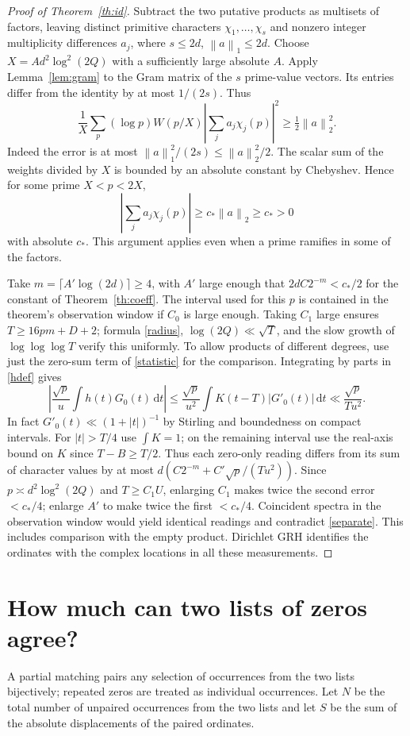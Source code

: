 \documentclass[11pt]{article}
\newcommand{\dd}{\,\mathrm d}
\newcommand{\abs}[1]{\left|#1\right|}
\newcommand{\norm}[1]{\left\lVert#1\right\rVert}
\begin{document}
\begin{proof}[Proof of Theorem~\ref{th:id}]
Subtract the two putative products as multisets of factors, leaving distinct primitive characters $\chi_1,\ldots,\chi_s$ and nonzero integer multiplicity differences $a_j$, where $s\le 2d$, $\norm a_1\le2d$. Choose $X=A d^2\log^2(2Q)$ with a sufficiently large absolute $A$. Apply Lemma~\ref{lem:gram} to the Gram matrix of the $s$ prime-value vectors. Its entries differ from the identity by at most $1/(2s)$. Thus
\[
 \frac1X\sum_p (\log p)W(p/X)\abs{\sum_j a_j\chi_j(p)}^2
     \ge \tfrac12\norm a_2^2.
\]
Indeed the error is at most $\norm a_1^2/(2s)\le\norm a_2^2/2$. The scalar sum of the weights divided by $X$ is bounded by an absolute constant by Chebyshev. Hence for some prime $X<p<2X$,
\begin{equation}\label{separate}
            \abs{\sum_j a_j\chi_j(p)}\ge c_*\norm a_2\ge c_*>0
\end{equation}
with absolute $c_*$. This argument applies even when a prime ramifies in some of the factors.

Take $m=\lceil A'\log(2d)\rceil\ge4$, with $A'$ large enough that
$2dC2^{-m}<c_*/2$ for the constant of Theorem~\ref{th:coeff}. The interval used for this $p$ is contained in the theorem's observation window if $C_0$ is large enough. Taking $C_1$ large ensures $T\ge 16pm+D+2$; formula \eqref{radius}, $\log(2Q)\ll\sqrt T$, and the slow growth of $\log\log\log T$ verify this uniformly. To allow products of different degrees, use just the zero-sum term of \eqref{statistic} for the comparison. Integrating by parts in \eqref{hdef} gives
\[
 \abs{\frac{\sqrt p}{u}\int h(t)G_0(t)\dd t}
 \le \frac{\sqrt p}{u^2}\int K(t-T)|G'_0(t)|\dd t
 \ll \frac{\sqrt p}{T u^2}.
\]
In fact $G'_0(t)\ll(1+|t|)^{-1}$ by Stirling and boundedness on compact intervals. For $|t|>T/4$ use $\int K=1$; on the remaining interval use the real-axis bound on $K$ since $T-B\ge T/2$. Thus each zero-only reading differs from its sum of character values by at most $d(C2^{-m}+C'\sqrt p/(Tu^2))$. Since $p\asymp d^2\log^2(2Q)$ and $T\ge C_1 U$, enlarging $C_1$ makes twice the second error $<c_*/4$; enlarge $A'$ to make twice the first $<c_*/4$. Coincident spectra in the observation window would yield identical readings and contradict \eqref{separate}. This includes comparison with the empty product. Dirichlet GRH identifies the ordinates with the complex locations in all these measurements.
\end{proof}

\section{How much can two lists of zeros agree?}
A partial matching pairs any selection of occurrences from the two lists bijectively; repeated zeros are treated as individual occurrences. Let $N$ be the total number of unpaired occurrences from the two lists and let $S$ be the sum of the absolute displacements of the paired ordinates.
\end{document}
